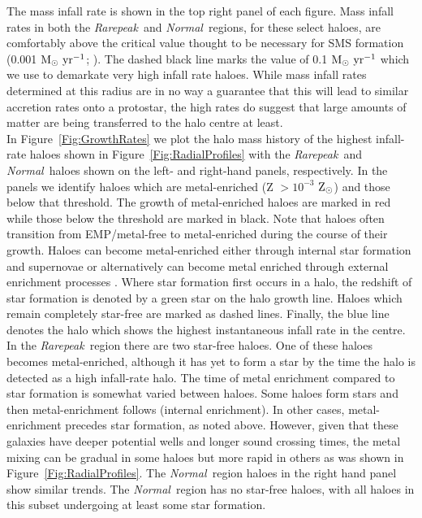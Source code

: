 \documentclass[twocolumn,iop,revtex4]{openjournal}
\newcommand{\msolaryr} {$\rm{M_{\odot}~yr^{-1}}~$}
\newcommand{\msolaryrc} {$\rm{M_{\odot}~yr^{-1}}$}
\newcommand{\zsolarc} {$\rm{Z_{\odot}}$}
\newcommand{\rarepeak} {\textit{Rarepeak~}}
\newcommand{\normal} {\textit{Normal~}}
\begin{document}
\indent The mass infall rate is shown in the top right panel of each figure. 
Mass infall rates in both the \rarepeak and \normal regions, for these select haloes, are
comfortably above the critical value thought to be necessary for SMS formation (0.001
\msolaryrc; \citealt{Haelmmerle_2018}). The dashed black line marks the value of 0.1 \msolaryr which we use to demarkate very high infall rate haloes.
While mass infall rates determined at this radius are in no
way a guarantee that this will lead to similar accretion rates onto a protostar, the high rates do
suggest that large amounts of matter are being transferred to the halo centre at least. \\
\indent In Figure~\ref{Fig:GrowthRates} we plot the halo mass history of the highest
infall-rate haloes shown in Figure~\ref{Fig:RadialProfiles} with the \rarepeak and \normal haloes
shown on the left- and right-hand panels, respectively. In the panels we identify haloes which
are metal-enriched (Z $> 10^{-3}$ \zsolarc) and those below that threshold. The growth of
metal-enriched haloes are marked in red while those below the threshold are marked in black. Note
that haloes often transition from EMP/metal-free to metal-enriched during the course of their growth. 
Haloes can become metal-enriched either through internal star formation and
supernovae or alternatively can become metal enriched through external enrichment processes
\citep[e.g.,][]{Smith_2015}. Where star formation first
occurs in a halo, the redshift of star formation is denoted by a green star on the halo growth line. 
Haloes which remain completely star-free are marked as dashed lines. Finally, the blue line denotes
the halo which shows the highest instantaneous infall rate in the centre. \\
\indent In the \rarepeak region there are two
star-free haloes. One of these haloes becomes metal-enriched, although it has yet to form
a star by the time the halo is detected as a high infall-rate halo. The time of metal enrichment
compared to star formation is somewhat varied between haloes. Some haloes form stars and then
metal-enrichment follows (internal enrichment). In other cases, metal-enrichment precedes
star formation, as noted above.
However, given that these galaxies have deeper potential wells and longer sound crossing times,
the metal mixing can be gradual in some haloes but more rapid in others as was shown in Figure~\ref{Fig:RadialProfiles}.
The \normal region haloes in the right hand panel show similar trends.
The \normal region has no star-free haloes, with all haloes in this subset undergoing at
least some star formation.
\end{document}

